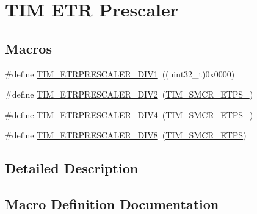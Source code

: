 \hypertarget{group___t_i_m___e_t_r___prescaler}{}\section{T\+IM E\+TR Prescaler}
\label{group___t_i_m___e_t_r___prescaler}
\subsection*{Macros}
\begin{DoxyCompactItemize}
\item 
\#define \hyperlink{group___t_i_m___e_t_r___prescaler_gabead5364c62645592e42545ba09ab88a}{T\+I\+M\+\_\+\+E\+T\+R\+P\+R\+E\+S\+C\+A\+L\+E\+R\+\_\+\+D\+I\+V1}~((uint32\+\_\+t)0x0000)
\item 
\#define \hyperlink{group___t_i_m___e_t_r___prescaler_gaf7fe49f67bdb6b33b9b41953fee75680}{T\+I\+M\+\_\+\+E\+T\+R\+P\+R\+E\+S\+C\+A\+L\+E\+R\+\_\+\+D\+I\+V2}~(\hyperlink{group___peripheral___registers___bits___definition_ga00b43cd09557a69ed10471ed76b228d8}{T\+I\+M\+\_\+\+S\+M\+C\+R\+\_\+\+E\+T\+P\+S\+\_})
\item 
\#define \hyperlink{group___t_i_m___e_t_r___prescaler_gaa09da30c3cd28f1fe6b6f3f599a5212c}{T\+I\+M\+\_\+\+E\+T\+R\+P\+R\+E\+S\+C\+A\+L\+E\+R\+\_\+\+D\+I\+V4}~(\hyperlink{group___peripheral___registers___bits___definition_gabf12f04862dbc92ca238d1518b27b16b}{T\+I\+M\+\_\+\+S\+M\+C\+R\+\_\+\+E\+T\+P\+S\+\_})
\item 
\#define \hyperlink{group___t_i_m___e_t_r___prescaler_ga834e38200874cced108379b17a24d0b7}{T\+I\+M\+\_\+\+E\+T\+R\+P\+R\+E\+S\+C\+A\+L\+E\+R\+\_\+\+D\+I\+V8}~(\hyperlink{group___peripheral___registers___bits___definition_ga0ebb9e631876435e276211d88e797386}{T\+I\+M\+\_\+\+S\+M\+C\+R\+\_\+\+E\+T\+PS})
\end{DoxyCompactItemize}


\subsection{Detailed Description}


\subsection{Macro Definition Documentation}
